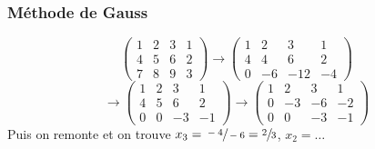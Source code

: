 \subsubsection*{Méthode de Gauss}
\noindent
\begin{equation}
    \left(\begin{array}{ccc|c}
        1 & 2 & 3 & 1 \\
        4 & 5 & 6 & 2 \\
        7 & 8 & 9 & 3
    \end{array}\right)
    \rightarrow
    \left(\begin{array}{ccc|c}
        1 & 2  & 3   & 1  \\
        4 & 4  & 6   & 2  \\
        0 & -6 & -12 & -4
    \end{array}\right)
    \nonumber
\end{equation}
\begin{equation}
    \rightarrow
    \left(\begin{array}{ccc|c}
        1 & 2 & 3  & 1  \\
        4 & 5 & 6  & 2  \\
        0 & 0 & -3 & -1
    \end{array}\right)
    \rightarrow
    \left(\begin{array}{ccc|c}
        1 & 2  & 3  & 1  \\
        0 & -3 & -6 & -2 \\
        0 & 0  & -3 & -1
    \end{array}\right)
    \nonumber
\end{equation}
Puis on remonte et on trouve $x_3=\sfrac{-4}{-6}=\sfrac{2}{3}$, $x_2=\dots$
